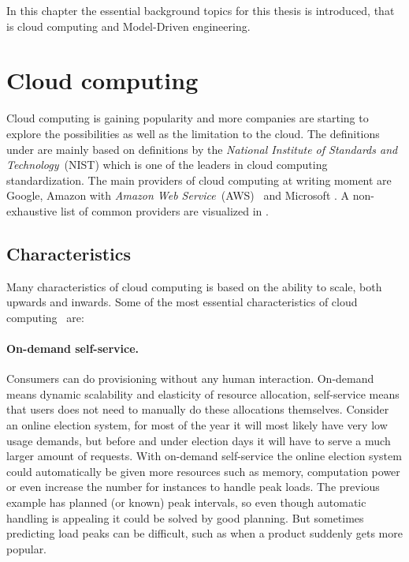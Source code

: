 


In this chapter the essential background topics for this thesis is introduced,
that is cloud computing and Model-Driven engineering.

\section{Cloud computing}

Cloud computing is gaining popularity and more companies are starting 
to explore the possibilities as well as the limitation to the cloud.
The definitions under are mainly based on definitions by 
the \emph{National Institute of Standards and Technology}~(NIST) which is one of 
the leaders in cloud computing standardization.
The main providers of cloud computing at writing moment 
are Google, Amazon with \emph{Amazon Web Service}~(AWS)~\cite{aws} and Microsoft .
A non-exhaustive list of common providers are visualized in .

\subsection{Characteristics}

Many characteristics of cloud computing is based on the ability to scale, both upwards and inwards.
Some of the most essential characteristics of cloud computing~\cite{nist:mell11} are:

\paragraph{On-demand self-service.} 

Consumers can do provisioning without any human interaction.
On-demand means dynamic scalability and elasticity of resource allocation,
self-service means that users does not need to manually do these allocations themselves.
Consider an online election system, for most of the year it will most likely have very
low usage demands, but before and under election days it will have to serve
a much larger amount of requests. With on-demand self-service the online election system
could automatically be given more resources such as memory, computation power or even
increase the number for instances to handle peak loads.
The previous example has planned (or known) peak intervals, so even though automatic handling
is appealing it could be solved by good planning. 
But sometimes predicting load peaks can be difficult, such as when a product suddenly
gets more popular.

